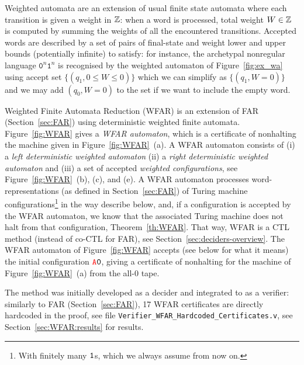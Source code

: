 Weighted automata are an extension of usual finite state automata where each transition is given a weight in $\mathbb{Z}$: when a word is processed, total weight $W \in \mathbb{Z}$ is computed by summing the weights of all the encountered transitions. Accepted words are described by a set of pairs of final-state and weight lower and upper bounds (potentially infinite) to satisfy: for instance, the archetypal nonregular language $\texttt{0}^n \texttt{1}^n$ is recognised by the weighted automaton of Figure~\ref{fig:ex_wa} using accept set $\{(q_1,0 \leq W \leq 0)\}$ which we can simplify as $\{(q_1,W=0)\}$ and we may add $(q_0,W=0)$ to the set if we want to include the empty word.

Weighted Finite Automata Reduction (WFAR) is an extension of FAR (Section~\ref{sec:FAR}) using deterministic weighted finite automata. Figure~\ref{fig:WFAR} gives a \textit{WFAR automaton}, which is a certificate of nonhalting the machine given in Figure~\ref{fig:WFAR}~(a). A WFAR automaton consists of (i) a \textit{left deterministic weighted automaton} (ii) a \textit{right deterministic weighted automaton} and (iii) a set of accepted \textit{weighted configurations}, see Figure~\ref{fig:WFAR}~(b), (c), and (e).
A WFAR automaton processes word-representations (as defined in Section~\ref{sec:FAR}) of Turing machine configurations\footnote{With finitely many $\texttt{1}$s, which we always assume from now on.} in the way describe below, and, if a configuration is accepted by the WFAR automaton, we know that the associated Turing machine does not halt from that configuration, Theorem~\ref{th:WFAR}. That way, WFAR is a CTL method (instead of co-CTL for FAR), see Section~\ref{sec:deciders-overview}. The WFAR automaton of Figure~\ref{fig:WFAR} accepts (see below for what it means) the initial configuration $\texttt{\stateA}\szero$, giving a certificate of nonhalting for the machine of Figure~\ref{fig:WFAR}~(a) from the all-0 tape.

The method was initially developed as a decider \cite{iijil1_2025_14914502} and integrated to \CoqBB as a verifier: similarly to FAR (Section~\ref{sec:FAR}), 17 WFAR certificates are directly hardcoded in the \Coq proof, see file \texttt{Verifier\_WFAR\_Hardcoded\_Certificates.v}, see Section~\ref{sec:WFAR:results} for results.

